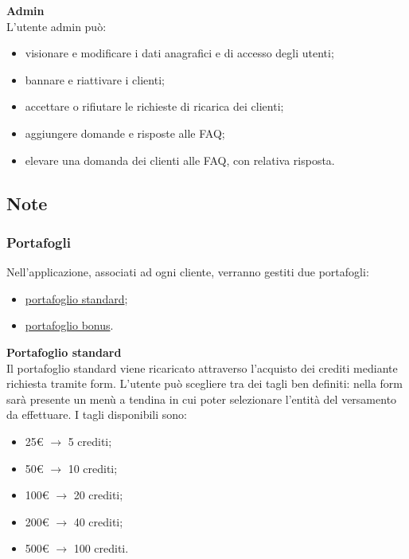 \documentclass[a4paper, 14pt]{article}
\begin{document}
\begin{flushleft}
			\bigskip \textbf{Admin} \\ \smallskip
			L'utente admin può:
			\begin{itemize}
				\item visionare e modificare i dati anagrafici e di accesso degli utenti;
				\item bannare e riattivare i clienti;
				\item accettare o rifiutare le richieste di ricarica dei clienti;
				\item aggiungere domande e risposte alle FAQ;
				\item elevare una domanda dei clienti alle FAQ, con relativa risposta.
			\end{itemize}
		
		\subsection{Note}
			\subsubsection{Portafogli} \label{Portafogli}
				Nell'applicazione, associati ad ogni cliente, verranno gestiti due portafogli:
				\begin{itemize}
					\item \underline{portafoglio standard};
					\item \underline{portafoglio bonus}.
				\end{itemize}

				\bigskip \textbf{Portafoglio standard} \\ \smallskip \label{PortSTD}			
				Il portafoglio standard viene ricaricato attraverso l’acquisto dei crediti mediante richiesta tramite form.
				L’utente può scegliere tra dei tagli ben definiti: nella form sarà presente un menù a tendina in cui poter selezionare l'entità del versamento da effettuare.
				I tagli disponibili sono:
				\begin{itemize}
					\item 25\euro \> $\rightarrow$ 5 crediti;
					\item 50\euro \> $\rightarrow$ 10 crediti;
					\item 100\euro \> $\rightarrow$ 20 crediti;
					\item 200\euro \> $\rightarrow$ 40 crediti;
					\item 500\euro \> $\rightarrow$ 100 crediti.
				\end{itemize}
				

\end{flushleft}
\end{document}

